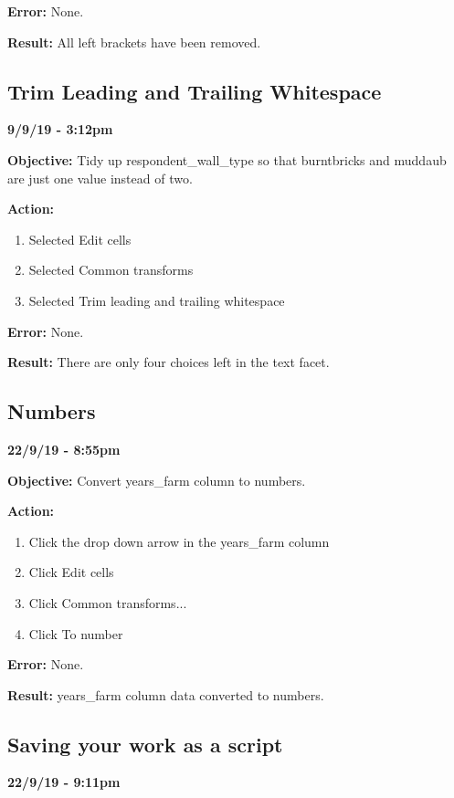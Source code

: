 \documentclass{article}
\begin{document}
\textbf{Error:} None.

\textbf{Result:} All left brackets have been removed.

\subsection{Trim Leading and Trailing Whitespace}

\textbf{9/9/19 - 3:12pm}

\textbf{Objective:} Tidy up respondent\_wall\_type so that burntbricks and muddaub are just one value instead of two.

\textbf{Action:}

\begin{enumerate}
    \item Selected Edit cells
    \item Selected Common transforms
    \item Selected Trim leading and trailing whitespace
\end{enumerate}

\textbf{Error:} None.

\textbf{Result:} There are only four choices left in the text facet.

\subsection{Numbers}

\textbf{22/9/19 - 8:55pm}

\textbf{Objective:} Convert years\_farm column to numbers.

\textbf{Action:}

\begin{enumerate}
    \item Click the drop down arrow in the years\_farm column
    \item Click Edit cells
    \item Click Common transforms...
    \item Click To number
\end{enumerate}

\textbf{Error:} None.

\textbf{Result:} years\_farm column data converted to numbers.

\subsection{Saving your work as a script}

\textbf{22/9/19 - 9:11pm}
\end{document}
